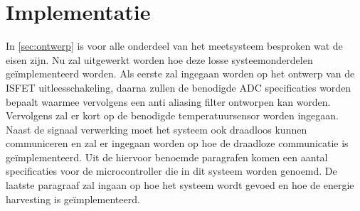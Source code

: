 \section{Implementatie}
In \cref{sec:ontwerp} is voor alle onderdeel van het \si{\pH} meetsysteem besproken wat de eisen zijn.
Nu zal uitgewerkt worden hoe deze losse systeemonderdelen geïmplementeerd worden.
Als eerste zal ingegaan worden op het ontwerp van de ISFET uitleesschakeling, daarna zullen de benodigde ADC specificaties worden bepaalt waarmee vervolgens een anti aliasing filter ontworpen kan worden. Vervolgens zal er kort op de benodigde temperatuursensor worden ingegaan. Naast de signaal verwerking moet het systeem ook draadloos kunnen communiceren en zal er ingegaan worden op hoe de draadloze communicatie is geïmplementeerd. Uit de hiervoor benoemde paragrafen komen een aantal specificaties voor de microcontroller die in dit systeem worden genoemd. De laatste paragraaf zal ingaan op hoe het systeem wordt gevoed en hoe de energie harvesting is geïmplementeerd.















